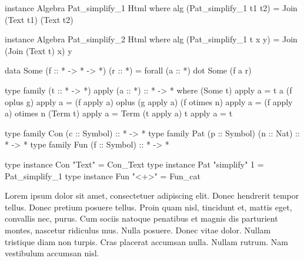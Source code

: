 \begin{code}
instance Algebra Pat_simplify_1 Html where
  alg (Pat_simplify_1 t1 t2) = Join (Text t1) (Text t2)

instance Algebra Pat_simplify_2 Html where
  alg (Pat_simplify_1 t x y) = Join (Join (Text t) x) y
\end{code}


\begin{code}
data Some (f :: * -> * -> *) (r :: *) = forall (a :: *) dot Some (f a r)
\end{code}

\begin{code}
type family (t :: * -> *) apply (a :: *) :: * -> *  where
  (Some t)      apply  a  = t a
  (f oplus g)   apply  a  = (f apply a) oplus (g apply a)
  (f otimes n)  apply  a  = (f apply a) otimes n
  (Term t)      apply  a  = Term (t apply a)
  t             apply  a  = t
\end{code}

\begin{code}
type family Con (c :: Symbol)             :: * -> *
type family Pat (p :: Symbol) (n :: Nat)  :: * -> *
type family Fun (f :: Symbol)             :: * -> *
\end{code}

\begin{code}
type instance Con "Text"        = Con_Text
type instance Pat "simplify" 1  = Pat_simplify_1
type instance Fun "<+>"         = Fun_cat
\end{code}

Lorem ipsum dolor sit amet, consectetuer adipiscing elit. Donec hendrerit tempor
tellus. Donec pretium posuere tellus. Proin quam nisl, tincidunt et, mattis
eget, convallis nec, purus. Cum sociis natoque penatibus et magnis dis
parturient montes, nascetur ridiculus mus. Nulla posuere. Donec vitae dolor.
Nullam tristique diam non turpis. Cras placerat accumsan nulla. Nullam rutrum.
Nam vestibulum accumsan nisl\cite{godefroid2005dart}.
